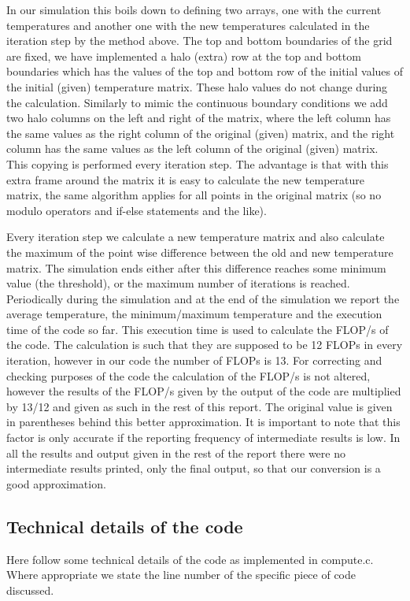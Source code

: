 \documentclass[11pt,a4paper,onecolumn]{article}
\begin{document}
In our simulation this boils down to defining two arrays, one with the current temperatures and another one with the new temperatures calculated in the iteration step by the method above. The top and bottom boundaries of the grid are fixed, we have implemented a halo (extra) row at the top and bottom boundaries which has the values of the top and bottom row of the initial values of the initial (given) temperature matrix. These halo values do not change during the calculation. Similarly to mimic the continuous boundary conditions we add two halo columns on the left and right of the matrix, where the left column has the same values as the right column of the original (given) matrix, and the right column has the same values as the left column of the original (given) matrix. This copying is performed every iteration step. The advantage is that with this extra frame around the matrix it is easy to calculate the new temperature matrix, the same algorithm applies for all points in the original matrix (so no modulo operators and if-else statements and the like).

Every iteration step we calculate a new temperature matrix and also calculate the maximum of the point wise difference between the old and new temperature matrix. The simulation ends either after this difference reaches some minimum value (the threshold), or the maximum number of iterations is reached. Periodically during the simulation and at the end of the simulation we report the average temperature, the minimum/maximum temperature and the execution time of the code so far. This execution time is used to calculate the FLOP/s of the code. The calculation is such that they are supposed to be 12 FLOPs in every iteration, however in our code the number of FLOPs is 13. For correcting and checking purposes of the code the calculation of the FLOP/s is not altered, however the results of the FLOP/s given by the output of the code are multiplied by 13/12 and given as such in the rest of this report. The original value is given in parentheses behind this better approximation. It is important to note that this factor is only accurate if the reporting frequency of intermediate results is low. In all the results and output given in the rest of the report there were no intermediate results printed, only the final output, so that our conversion is a good approximation.

\subsection{Technical details of the code}
Here follow some technical details of the code as implemented in compute.c. Where appropriate we state the line number of the specific piece of code discussed.
\end{document}
